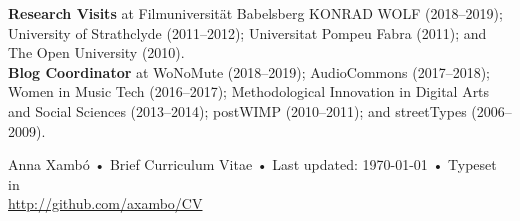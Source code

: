 \documentclass[10pt, a4paper]{article}
\begin{document}
{\textbf{Research Visits}} at Filmuniversität Babelsberg KONRAD WOLF (2018--2019); University of Strathclyde (2011--2012); Universitat Pompeu Fabra (2011); and The Open University (2010).\\

{\textbf{Blog Coordinator}} at WoNoMute (2018--2019); AudioCommons (2017--2018); Women in Music Tech (2016--2017); Methodological Innovation in Digital Arts and Social Sciences (2013--2014); postWIMP (2010--2011); and streetTypes (2006--2009).


\begin{center}
{\scriptsize  Anna Xambó •\- Brief Curriculum Vitae •\- Last updated: \today\- •\- %
Typeset in \href{http://nitens.org/taraborelli/cvtex}{
\XeTeX }\\
\href{http://github.com/axambo/CV}{http://github.com/axambo/CV}}
\end{center}
\end{document}
